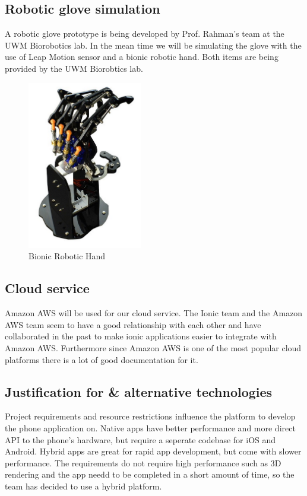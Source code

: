 \documentclass[a4paper,10pt]{article}
\begin{document}
    \subsection{Robotic glove simulation}
        A robotic glove prototype is being developed by Prof. Rahman's team at the UWM Biorobotics lab. In the mean time we will be simulating the glove with the use of Leap Motion sensor and a bionic robotic hand. Both items are being provided by the UWM Biorobtics lab.
        \begin{figure}[h]
         \centering
         \includegraphics[width=50mm, scale=0.1]{bionicRoboticHand}
         \caption{Bionic Robotic Hand}
        \end{figure}
        
    \subsection{Cloud service}
        Amazon AWS will be used for our cloud service. The Ionic team and the Amazon AWS team seem to have a good relationship with each other and have collaborated in the past to make ionic applications easier to integrate with Amazon AWS. Furthermore since Amazon AWS is one of the most popular cloud platforms there is a lot of good documentation for it. 
        
    \subsection{Justification for \& alternative technologies}
Project requirements and resource restrictions influence the platform to develop the phone application on. Native apps have better performance and more direct API to the phone's hardware, but require a seperate codebase for iOS and Android. Hybrid apps are great for rapid app development, but come with slower performance. The requirements do not require high performance such as 3D rendering and the app needd to be completed in a short amount of time, so the team has decided to use a hybrid platform.
\end{document}
